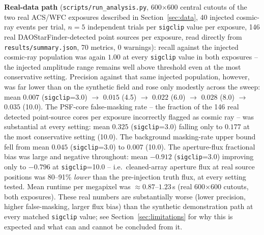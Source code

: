 \documentclass[11pt]{article}
\begin{document}
\textbf{Real-data path} (\texttt{scripts/run\_analysis.py}, 600$\times$600
central cutouts of the two real ACS/WFC exposures described in
Section~\ref{sec:data}, 40 injected cosmic-ray events per trial, $n=5$
independent trials per \texttt{sigclip} value per exposure, 146 real
DAOStarFinder-detected point sources per exposure, read directly from
\texttt{results/summary.json}, 70 metrics, 0 warnings): recall against the
injected cosmic-ray population was again $1.00$ at every \texttt{sigclip}
value in both exposures -- the injected amplitude range remains well above
threshold even at the most conservative setting. Precision against that same
injected population, however, was far lower than on the synthetic field and
rose only modestly across the sweep: mean $0.007$
(\texttt{sigclip}=3.0) $\to$ $0.015$ (4.5) $\to$ $0.022$ (6.0) $\to$ $0.028$
(8.0) $\to$ $0.035$ (10.0). The PSF-core false-masking rate -- the fraction
of the 146 real detected point-source cores per exposure incorrectly flagged
as cosmic ray -- was substantial at every setting: mean $0.325$
(\texttt{sigclip}=3.0) falling only to $0.177$ at the most conservative
setting (10.0). The background masking-rate upper bound fell from mean
$0.045$ (\texttt{sigclip}=3.0) to $0.007$ (10.0). The aperture-flux
fractional bias was large and negative throughout: mean $-0.912$
(\texttt{sigclip}=3.0) improving only to $-0.796$ at \texttt{sigclip}=10.0 --
i.e.\ cleaned-array aperture flux at real source positions was
80--91\% \emph{lower} than the pre-injection truth flux, at every setting
tested. Mean runtime per megapixel was $\approx 0.87$--$1.23$\,s (real
600$\times$600 cutouts, both exposures). These real numbers are
substantially worse (lower precision, higher false-masking, larger flux
bias) than the synthetic demonstration path at every matched
\texttt{sigclip} value; see Section~\ref{sec:limitations} for why this is
expected and what can and cannot be concluded from it.
\end{document}
